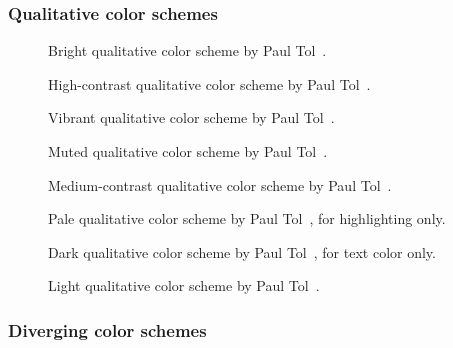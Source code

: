 \documentclass{article}
\begin{document}
\subsubsection{Qualitative color schemes}

\begin{figure}[ht]
    \centering
    \caption{Bright qualitative color scheme by Paul Tol~\cite{Tol}.}
    \label{fig:T_Q_B}
\end{figure}

\begin{figure}[ht]
    \centering
    \caption{High-contrast qualitative color scheme by Paul Tol~\cite{Tol}.}
    \label{fig:T_Q_HC}
\end{figure}

\begin{figure}[ht]
    \centering
    \caption{Vibrant qualitative color scheme by Paul Tol~\cite{Tol}.}
    \label{fig:T_Q_V}
\end{figure}

\begin{figure}[ht]
    \centering
    \caption{Muted qualitative color scheme by Paul Tol~\cite{Tol}.}
    \label{fig:T_Q_M}
\end{figure}

\begin{figure}[ht]
    \centering
    \caption{Medium-contrast qualitative color scheme by Paul Tol~\cite{Tol}.}
    \label{fig:T_Q_MC}
\end{figure}

\begin{figure}[ht]
    \centering
    \caption{Pale qualitative color scheme by Paul Tol~\cite{Tol}, for highlighting only.}
    \label{fig:T_Q_PH}
\end{figure}

\begin{figure}[ht]
    \centering
    \caption{Dark qualitative color scheme by Paul Tol~\cite{Tol}, for text color only.}
    \label{fig:T_Q_DT}
\end{figure}

\begin{figure}[ht]
    \centering
    \caption{Light qualitative color scheme by Paul Tol~\cite{Tol}.}
    \label{fig:T_Q_L}
\end{figure}

\subsubsection{Diverging color schemes}
\end{document}
